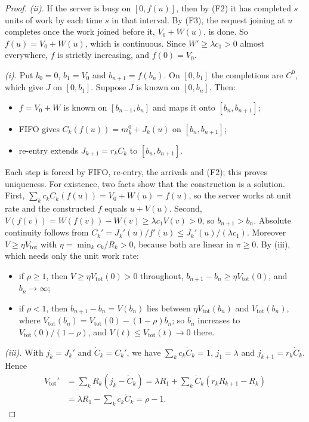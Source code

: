 \begin{proof}
\emph{(ii).} If the server is busy on $[0,f(u)]$, then by (F2) it has completed $s$ units of work by each time $s$ in that
interval. By (F3), the request joining at $u$ completes once the work joined before it, $V_0+W(u)$, is done. So
$f(u)=V_0+W(u)$, which is continuous. Since $W'\ge\lambda c_1>0$ almost everywhere, $f$ is strictly increasing, and
$f(0)=V_0$.

\emph{(i).} Put $b_0=0$, $b_1=V_0$ and $b_{n+1}=f(b_n)$. On $[0,b_1]$ the completions are $C^0$, which give $J$ on
$[0,b_1]$. Suppose $J$ is known on $[0,b_n]$. Then:
\begin{itemize}[leftmargin=*,nosep]
\item $f=V_0+W$ is known on $[b_{n-1},b_n]$ and maps it onto $[b_n,b_{n+1}]$;
\item FIFO gives $C_k(f(u))=m^0_k+J_k(u)$ on $[b_n,b_{n+1}]$;
\item re-entry extends $J_{k+1}=r_kC_k$ to $[b_n,b_{n+1}]$.
\end{itemize}
Each step is forced by FIFO, re-entry, the arrivals and (F2); this proves uniqueness. For existence, two facts show that the
construction is a solution. First, $\sum_kc_kC_k(f(u))=V_0+W(u)=f(u)$, so the server works at unit rate and the constructed
$f$ equals $u+V(u)$. Second, $V(f(v))=W(f(v))-W(v)\ge\lambda c_1V(v)>0$, so $b_{n+1}>b_n$. Absolute continuity follows from
$C_k'=J_k'(u)/f'(u)\le J_k'(u)/(\lambda c_1)$. Moreover $V\ge\eta V_{\mathrm{tot}}$ with $\eta=\min_kc_k/R_k>0$, because both
are linear in $\pi\ge0$. By (iii), which needs only the unit work rate:
\begin{itemize}[leftmargin=*,nosep]
\item if $\rho\ge1$, then $V\ge\eta V_{\mathrm{tot}}(0)>0$ throughout, $b_{n+1}-b_n\ge\eta V_{\mathrm{tot}}(0)$, and
$b_n\to\infty$;
\item if $\rho<1$, then $b_{n+1}-b_n=V(b_n)$ lies between $\eta V_{\mathrm{tot}}(b_n)$ and $V_{\mathrm{tot}}(b_n)$, where
$V_{\mathrm{tot}}(b_n)=V_{\mathrm{tot}}(0)-(1-\rho)b_n$; so $b_n$ increases to $V_{\mathrm{tot}}(0)/(1-\rho)$, and
$V(t)\le V_{\mathrm{tot}}(t)\to0$ there.
\end{itemize}

\emph{(iii).} With $j_k=J_k'$ and $\dot C_k=C_k'$, we have $\sum_kc_k\dot C_k=1$, $j_1=\lambda$ and $j_{k+1}=r_k\dot C_k$. Hence
\begin{align*}
V_{\mathrm{tot}}'&=\textstyle\sum_kR_k(j_k-\dot C_k)=\lambda R_1+\sum_k\dot C_k(r_kR_{k+1}-R_k)\\
&=\textstyle\lambda R_1-\sum_kc_k\dot C_k=\rho-1.
\end{align*}


\end{proof}
